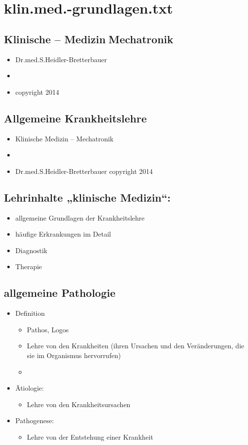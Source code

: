 \section{klin.med.-grundlagen.txt}

\subsection{Klinische – MedizinMechatronik}
	\begin{itemize}
		\item Dr.med.S.Heidler-Bretterbauer
		\item 
		\item copyright 2014
	\end{itemize}

\subsection{Allgemeine Krankheitslehre}
	\begin{itemize}
		\item Klinische Medizin – Mechatronik
		\item 
		\item Dr.med.S.Heidler-Bretterbauer	copyright 2014
	\end{itemize}

\subsection{Lehrinhalte „klinische Medizin“:}
	\begin{itemize}
		\item allgemeine Grundlagen der Krankheitslehre
		\item häufige Erkrankungen im Detail
		\item Diagnostik
		\item Therapie
	\end{itemize}

\subsection{allgemeine Pathologie}
	\begin{itemize}
		\item Definition
			\begin{itemize}
				\item Pathos, Logos
				\item Lehre von den Krankheiten (ihren Ursachen und den  Veränderungen, die sie im Organismus hervorrufen)
				\item 
			\end{itemize}
		\item Ätiologie:
			\begin{itemize}
				\item Lehre von den Krankheitsursachen
			\end{itemize}
		\item Pathogenese:
			\begin{itemize}
				\item Lehre von der Entstehung einer Krankheit
			\end{itemize}
	\end{itemize}

